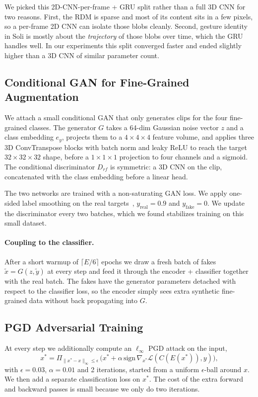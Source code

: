 \documentclass[10pt,twocolumn,letterpaper]{article}
\begin{document}
We picked this 2D-CNN-per-frame + GRU split rather than a full 3D CNN
for two reasons. First, the RDM is sparse and most of its content sits
in a few pixels, so a per-frame 2D CNN can isolate those blobs cleanly.
Second, gesture identity in Soli is mostly about the \emph{trajectory}
of those blobs over time, which the GRU handles well. In our
experiments this split converged faster and ended slightly higher than
a 3D CNN of similar parameter count.

\subsection{Conditional GAN for Fine-Grained Augmentation}
\label{sec:gan}
We attach a small conditional GAN that only generates clips for the
four fine-grained classes. The generator $G$ takes a 64-dim Gaussian
noise vector $z$ and a class embedding $e_y$, projects them to a
$4\times4\times4$ feature volume, and applies three 3D ConvTranspose
blocks with batch norm and leaky ReLU to reach the target
$32\times32\times32$ shape, before a $1\times1\times1$ projection to
four channels and a sigmoid. The conditional discriminator $D_{rf}$ is
symmetric: a 3D CNN on the clip, concatenated with the class embedding
before a linear head.

The two networks are trained with a non-saturating GAN loss. We apply
one-sided label smoothing on the real targets~\cite{salimans2016},
$y_{\text{real}} = 0.9$ and $y_{\text{fake}} = 0$. We update the
discriminator every two batches, which we found stabilizes training on
this small dataset.

\paragraph{Coupling to the classifier.} After a short warmup of
$\lceil E/6 \rceil$ epochs we draw a fresh batch of fakes
$\tilde{x} = G(z, \tilde{y})$ at every step and feed it through the
encoder + classifier together with the real batch. The fakes have the
generator parameters detached with respect to the classifier loss, so
the encoder simply sees extra synthetic fine-grained data without back
propagating into $G$.

\subsection{PGD Adversarial Training}
\label{sec:pgd}
At every step we additionally compute an $\ell_\infty$ PGD attack on
the input,
\begin{equation}
x^* = \Pi_{\|x^* - x\|_\infty \le \epsilon}\,
\Big(x^* + \alpha\, \mathrm{sign}\, \nabla_{x^*} \mathcal{L}(C(E(x^*)), y) \Big),
\label{eq:pgd}
\end{equation}
with $\epsilon{=}0.03$, $\alpha{=}0.01$ and 2 iterations, started from
a uniform $\epsilon$-ball around $x$. We then add a separate
classification loss on $x^*$. The cost of the extra forward and
backward passes is small because we only do two iterations.
\end{document}
